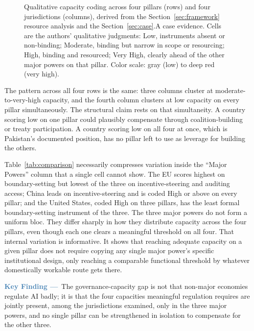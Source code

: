 \documentclass{ieeeaccess}
\begin{document}
\begin{figure}[!t]
{%
}
\caption{Qualitative capacity coding across four pillars (rows) and four jurisdictions (columns), derived from the Section~\ref{sec:framework} resource analysis and the Section~\ref{sec:case}.A case evidence. Cells are the authors' qualitative judgments: Low, instruments absent or non-binding; Moderate, binding but narrow in scope or resourcing; High, binding and resourced; Very High, clearly ahead of the other major powers on that pillar. Color scale: gray (low) to deep red (very high).}
\label{fig:heatmap}
\end{figure}

The pattern across all four rows is the same: three columns cluster at moderate-to-very-high capacity, and the fourth column clusters at low capacity on every pillar simultaneously. The structural claim rests on that simultaneity. A country scoring low on one pillar could plausibly compensate through coalition-building or treaty participation. A country scoring low on all four at once, which is Pakistan's documented position, has no pillar left to use as leverage for building the others.

Table~\ref{tab:comparison} necessarily compresses variation inside the ``Major Powers'' column that a single cell cannot show. The EU scores highest on boundary-setting but lowest of the three on incentive-steering and auditing access; China leads on incentive-steering and is coded High or above on every pillar; and the United States, coded High on three pillars, has the least formal boundary-setting instrument of the three. The three major powers do not form a uniform bloc. They differ sharply in how they distribute capacity across the four pillars, even though each one clears a meaningful threshold on all four. That internal variation is informative. It shows that reaching adequate capacity on a given pillar does not require copying any single major power's specific institutional design, only reaching a comparable functional threshold by whatever domestically workable route gets there.

\begin{mdframed}[linecolor=steelblue, linewidth=1.2pt, backgroundcolor=steelblue!6,
  innerleftmargin=8pt, innerrightmargin=8pt, innertopmargin=6pt, innerbottommargin=6pt,
  roundcorner=4pt]
\noindent\textcolor{steelblue}{\bfseries Key Finding ---}~The governance-capacity gap is not that non-major economies regulate AI badly; it is that the four capacities meaningful regulation requires are jointly present, among the jurisdictions examined, only in the three major powers, and no single pillar can be strengthened in isolation to compensate for the other three.
\end{mdframed}
\end{document}
